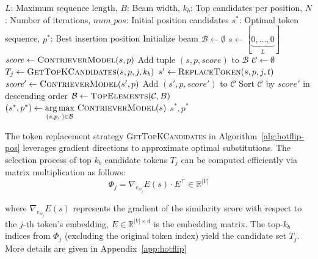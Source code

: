 \begin{algorithm}
\caption{Position-Aware Beam Search}
\label{alg:hotflip-pos}
\begin{algorithmic}[1]
\Require 
    $L$: Maximum sequence length, 
    $B$: Beam width, 
    $k_b$: Top candidates per position,
    $N$: Number of iterations,
    $\mathit{num\_pos}$: Initial position candidates
\Ensure 
    $s^*$: Optimal token sequence,
    $p^*$: Best insertion position
\State Initialize beam $\mathcal{B} \gets \emptyset$
    \State $s \gets [\underbrace{0, \ldots, 0}_{L}]$ 
    \State $\mathit{score} \gets \textsc{ContrieverModel}(s, p)$ 
    \State Add tuple $(s, p, \mathit{score})$ to $\mathcal{B}$
\EndFor
{}
    \State $\mathcal{C} \gets \emptyset$ 
         
            \State $T_j \gets \textsc{GetTopKCandidates}(s, p, j, k_b)$ 
                \State $s' \gets \textsc{ReplaceToken}(s, p, j, t)$
                \State $\mathit{score}' \gets \textsc{ContrieverModel}(s',p)$
                \State Add $(s', p, \mathit{score}')$ to $\mathcal{C}$
            \EndFor
        \EndFor
    \EndFor
    \State Sort $\mathcal{C}$ by $\mathit{score}'$ in descending order
    \State $\mathcal{B} \gets \textsc{TopElements}(\mathcal{C}, B)$ 
\EndFor
\State $(s^*, p^*) \gets \underset{(s,p,\cdot)\in\mathcal{B}}{\arg\max}\ \textsc{ContrieverModel}(s)$
\State \Return $s^*, p^*$
\end{algorithmic}
\end{algorithm}

The token replacement strategy \textsc{GetTopKCandidates} in Algorithm~\ref{alg:hotflip-pos} leverages gradient directions to approximate optimal substitutions. 
% 
The selection process of top $k_b$ candidate tokens $T_j$ can be computed efficiently via matrix multiplication as follows:
\begin{equation}
    \Phi_j = \nabla_{e_{w_j}} E(s) \cdot E^\top \in \mathbb{R}^{|V|}
\end{equation}

where $\nabla_{e_{w_j}} E(s)$ represents the gradient of the similarity score with respect to the $j$-th token's embedding, $E \in \mathbb{R}^{|V|\times d}$ is the embedding matrix. The top-$k_b$ indices from $\Phi_j$ (excluding the original token index) yield the candidate set $T_j$. More details are given in Appendix~\autoref{app:hotflip}





